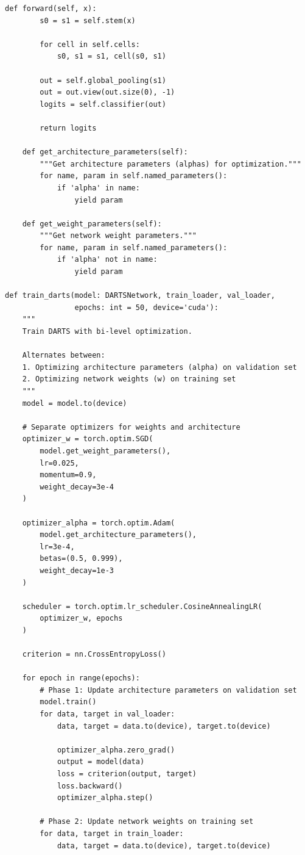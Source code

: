 \begin{lstlisting}[style=python, caption=Neural Architecture Search with DARTS]
    def forward(self, x):
        s0 = s1 = self.stem(x)

        for cell in self.cells:
            s0, s1 = s1, cell(s0, s1)

        out = self.global_pooling(s1)
        out = out.view(out.size(0), -1)
        logits = self.classifier(out)

        return logits

    def get_architecture_parameters(self):
        """Get architecture parameters (alphas) for optimization."""
        for name, param in self.named_parameters():
            if 'alpha' in name:
                yield param

    def get_weight_parameters(self):
        """Get network weight parameters."""
        for name, param in self.named_parameters():
            if 'alpha' not in name:
                yield param

def train_darts(model: DARTSNetwork, train_loader, val_loader,
                epochs: int = 50, device='cuda'):
    """
    Train DARTS with bi-level optimization.

    Alternates between:
    1. Optimizing architecture parameters (alpha) on validation set
    2. Optimizing network weights (w) on training set
    """
    model = model.to(device)

    # Separate optimizers for weights and architecture
    optimizer_w = torch.optim.SGD(
        model.get_weight_parameters(),
        lr=0.025,
        momentum=0.9,
        weight_decay=3e-4
    )

    optimizer_alpha = torch.optim.Adam(
        model.get_architecture_parameters(),
        lr=3e-4,
        betas=(0.5, 0.999),
        weight_decay=1e-3
    )

    scheduler = torch.optim.lr_scheduler.CosineAnnealingLR(
        optimizer_w, epochs
    )

    criterion = nn.CrossEntropyLoss()

    for epoch in range(epochs):
        # Phase 1: Update architecture parameters on validation set
        model.train()
        for data, target in val_loader:
            data, target = data.to(device), target.to(device)

            optimizer_alpha.zero_grad()
            output = model(data)
            loss = criterion(output, target)
            loss.backward()
            optimizer_alpha.step()

        # Phase 2: Update network weights on training set
        for data, target in train_loader:
            data, target = data.to(device), target.to(device)


\end{lstlisting}
